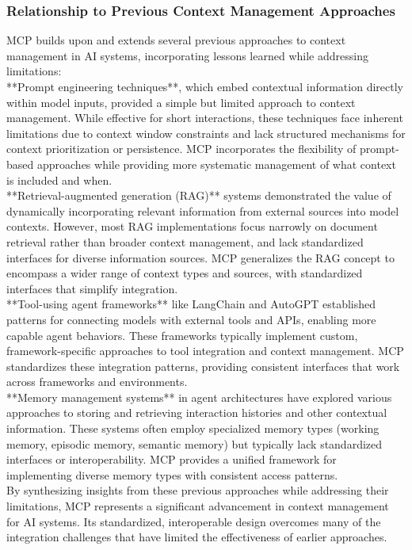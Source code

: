 \subsubsection{Relationship to Previous Context Management Approaches}
MCP builds upon and extends several previous approaches to context management in AI systems, incorporating lessons learned while addressing limitations:\\ \newline
**Prompt engineering techniques**, which embed contextual information directly within model inputs, provided a simple but limited approach to context management. While effective for short interactions, these techniques face inherent limitations due to context window constraints and lack structured mechanisms for context prioritization or persistence. MCP incorporates the flexibility of prompt-based approaches while providing more systematic management of what context is included and when.\\ \newline
**Retrieval-augmented generation (RAG)** systems demonstrated the value of dynamically incorporating relevant information from external sources into model contexts. However, most RAG implementations focus narrowly on document retrieval rather than broader context management, and lack standardized interfaces for diverse information sources. MCP generalizes the RAG concept to encompass a wider range of context types and sources, with standardized interfaces that simplify integration.\\ \newline
**Tool-using agent frameworks** like LangChain and AutoGPT established patterns for connecting models with external tools and APIs, enabling more capable agent behaviors. These frameworks typically implement custom, framework-specific approaches to tool integration and context management. MCP standardizes these integration patterns, providing consistent interfaces that work across frameworks and environments.\\ \newline
**Memory management systems** in agent architectures have explored various approaches to storing and retrieving interaction histories and other contextual information. These systems often employ specialized memory types (working memory, episodic memory, semantic memory) but typically lack standardized interfaces or interoperability. MCP provides a unified framework for implementing diverse memory types with consistent access patterns.\\ \newline
By synthesizing insights from these previous approaches while addressing their limitations, MCP represents a significant advancement in context management for AI systems. Its standardized, interoperable design overcomes many of the integration challenges that have limited the effectiveness of earlier approaches.\\
